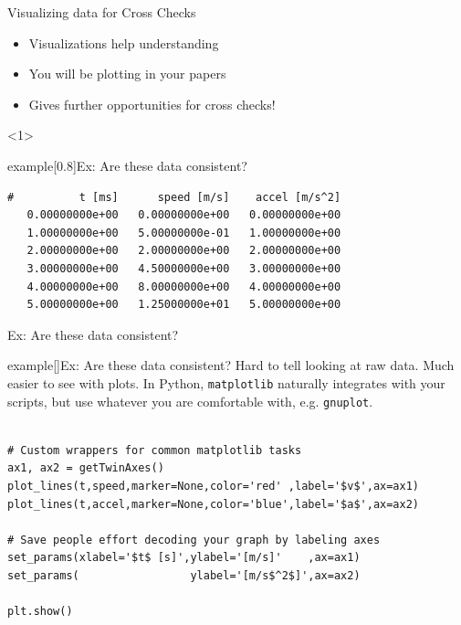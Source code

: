 

\begin{frame}[fragile]{Visualizing data for Cross Checks}
\begin{itemize}
\item Visualizations help understanding
\item You will be plotting in your papers
\item Gives further opportunities for cross checks!
\end{itemize}
\begin{onlyenv}<1>
\begin{varblock}{example}[0.8\textwidth]{Ex: Are these data consistent?}
\small
\begin{lstlisting}[style=MyPython]
#          t [ms]      speed [m/s]    accel [m/s^2]
   0.00000000e+00   0.00000000e+00   0.00000000e+00
   1.00000000e+00   5.00000000e-01   1.00000000e+00
   2.00000000e+00   2.00000000e+00   2.00000000e+00
   3.00000000e+00   4.50000000e+00   3.00000000e+00
   4.00000000e+00   8.00000000e+00   4.00000000e+00
   5.00000000e+00   1.25000000e+01   5.00000000e+00
\end{lstlisting}
\end{varblock}
\end{onlyenv}
\end{frame}


\begin{frame}[fragile]{Ex: Are these data consistent?}
\begin{varblock}{example}[\textwidth]{Ex: Are these data consistent?}
Hard to tell looking at raw data. Much easier to see with plots.
In Python, \texttt{matplotlib} naturally integrates with your scripts,
but use whatever you are comfortable with, e.g. \texttt{gnuplot}.
\begin{lstlisting}[style=mypython]

# Custom wrappers for common matplotlib tasks
ax1, ax2 = getTwinAxes()
plot_lines(t,speed,marker=None,color='red' ,label='$v$',ax=ax1)
plot_lines(t,accel,marker=None,color='blue',label='$a$',ax=ax2)

# Save people effort decoding your graph by labeling axes
set_params(xlabel='$t$ [s]',ylabel='[m/s]'    ,ax=ax1)
set_params(                 ylabel='[m/s$^2$]',ax=ax2)

plt.show()
\end{lstlisting}
\end{varblock}
\end{frame}

